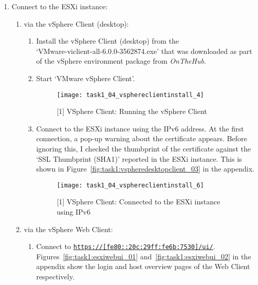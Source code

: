 \begin{enumerate}[resume*=task1methodology]
  \item Connect to the ESXi instance:
    \begin{enumerate}[label=(\alph*)]
      \item via the vSphere Client (desktop):
        \begin{enumerate}[label=\roman*.]
          \item Install the vSphere Client (desktop) from the\\`VMware-viclient-all-6.0.0-3562874.exe' that was downloaded as part of the vSphere environment package from \textit{OnTheHub\textsuperscript{\textregistered}}.
          \item Start `VMware vSphere Client'.
            \begin{figure}[H]
              \centering
              \captionsetup{skip=2pt}
              \texttt{[image: task1\_04\_vsphereclientinstall\_4]}
              \caption{[1] VSphere Client: Running the vSphere Client}
              \label{fig:task1:vspheredesktopclient_02}
            \end{figure}
          \item Connect to the ESXi instance using the IPv6 address. At the first connection, a pop-up warning about the certificate appears. Before ignoring this, I checked the thumbprint of the certificate against the `SSL Thumbprint (SHA1)' reported in the ESXi instance. This is shown in Figure~\ref{fig:task1:vspheredesktopclient_03} in the  appendix.
            \begin{figure}[H]
              \centering
              \captionsetup{skip=2pt}
              \texttt{[image: task1\_04\_vsphereclientinstall\_6]}
              \caption{[1] VSphere Client: Connected to the ESXi instance using IPv6}
              \label{fig:task1:vspheredesktopclient_04}
            \end{figure}
        \end{enumerate}
      \item via the vSphere Web Client:
        \begin{enumerate}[label=\roman*.]
          \item Connect to \texttt{\url{https://[fe80::20c:29ff:fe6b:7530]/ui/}}. Figures~\ref{fig:task1:esxiwebui_01} and~\ref{fig:task1:esxiwebui_02} in the  appendix show the login and host overview pages of the Web Client respectively.
        \end{enumerate}
    \end{enumerate}
\end{enumerate}

